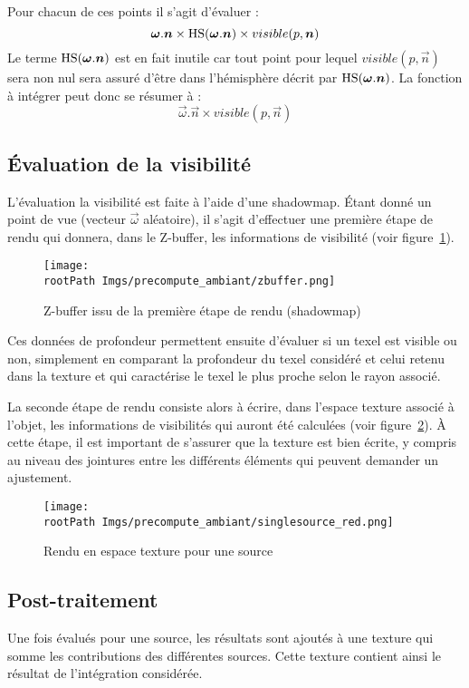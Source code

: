 \documentclass[10pt,a4paper,twoside, twocolumn]{report}
\newcommand*{\rootPath}{../}
\begin{document}
Pour chacun de ces points il s’agit d'évaluer :
	$$\vec\omega.\vec n\times \Hs(\vec \omega.\vec n)\times visible(p, \vec n)$$
Le terme $\Hs(\vec \omega.\vec n)$ est en fait inutile car tout point pour lequel $visible(p, \vec n)$ sera non nul sera assuré d’être dans l’hémisphère décrit par $\Hs(\vec \omega.\vec n)$. La fonction à intégrer peut donc se résumer à :
	$$\vec\omega.\vec n\times visible(p, \vec n)$$

\subsection{Évaluation de la visibilité}
L'évaluation la visibilité est faite à l'aide d'une shadowmap. Étant donné un point de vue (vecteur $\vec\omega$ aléatoire), il s’agit d’effectuer une première étape de rendu qui donnera, dans le Z-buffer, les informations de visibilité (voir figure~\ref{fig:precompute_ambiant:zbuffer}).

\begin{figure}[!ht]\centering
	\texttt{[image: \\rootPath Imgs/precompute\_ambiant/zbuffer.png]}
	\caption{Z-buffer issu de la première étape de rendu (shadowmap)}
	\label{fig:precompute_ambiant:zbuffer}
\end{figure}


Ces données de profondeur permettent ensuite d'évaluer si un texel est visible ou non, simplement en comparant la profondeur du texel considéré et celui retenu dans la texture et qui caractérise le texel le plus proche selon le rayon associé.

La seconde étape de rendu consiste alors à écrire, dans l’espace texture associé à l'objet, les informations de visibilités qui auront été calculées (voir figure~\ref{fig:precompute_ambiant:singlesource}). À cette étape, il est important de s'assurer que la texture est bien écrite, y compris au niveau des jointures entre les différents éléments qui peuvent demander un ajustement.\cite{Aila2005}\cite{Manson2012}

\begin{figure}[!ht]\centering
	\texttt{[image: \\rootPath Imgs/precompute\_ambiant/singlesource\_red.png]}
	\caption{Rendu en espace texture pour une source}
	\label{fig:precompute_ambiant:singlesource}
\end{figure}

\subsection{Post-traitement}
Une fois évalués pour une source, les résultats sont ajoutés à une texture qui somme les contributions des différentes sources. Cette texture contient ainsi le résultat de l'intégration considérée.
\end{document}
